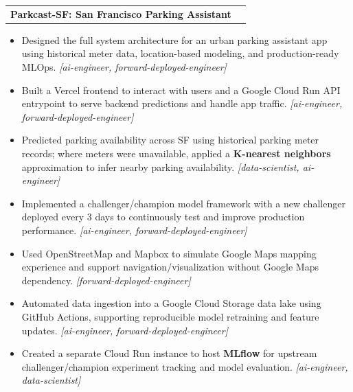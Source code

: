 \documentclass[letterpaper,11pt]{article}
\makeatletter
\newcommand{\resumeItem}[1]{
  \item\small{
    {#1 \vspace{-3pt}}
  }
}
\newcommand{\resumeProjectHeading}[2]{
  \vspace{-3pt}\item
    \begin{tabular*}{1.0\textwidth}[t]{l@{\extracolsep{\fill}}r}
      \textbf{#1} & \textbf{\small #2} \\
    \end{tabular*}\vspace{-7pt}
}
\newcommand{\resumeItemListStart}{\begin{itemize}}
\newcommand{\resumeItemListEnd}{\end{itemize}\vspace{0pt}}
\makeatother
\begin{document}
        \resumeProjectHeading
        {\textbf{Parkcast-SF: San Francisco Parking Assistant}}{}
        \resumeItemListStart
            \resumeItem{Designed the full system architecture for an urban parking assistant app using historical meter data, location-based modeling, and production-ready MLOps. \textit{[ai-engineer, forward-deployed-engineer]}}
            \resumeItem{Built a Vercel frontend to interact with users and a Google Cloud Run API entrypoint to serve backend predictions and handle app traffic. \textit{[ai-engineer, forward-deployed-engineer]}}
            \resumeItem{Predicted parking availability across SF using historical parking meter records; where meters were unavailable, applied a \textbf{K-nearest neighbors} approximation to infer nearby parking availability. \textit{[data-scientist, ai-engineer]}}
            \resumeItem{Implemented a challenger/champion model framework with a new challenger deployed every 3 days to continuously test and improve production performance. \textit{[ai-engineer, forward-deployed-engineer]}}
            \resumeItem{Used OpenStreetMap and Mapbox to simulate Google Maps mapping experience and support navigation/visualization without Google Maps dependency. \textit{[forward-deployed-engineer]}}
            \resumeItem{Automated data ingestion into a Google Cloud Storage data lake using GitHub Actions, supporting reproducible model retraining and feature updates. \textit{[ai-engineer, forward-deployed-engineer]}}
            \resumeItem{Created a separate Cloud Run instance to host \textbf{MLflow} for upstream challenger/champion experiment tracking and model evaluation. \textit{[ai-engineer, data-scientist]}}
        \resumeItemListEnd
\end{document}
